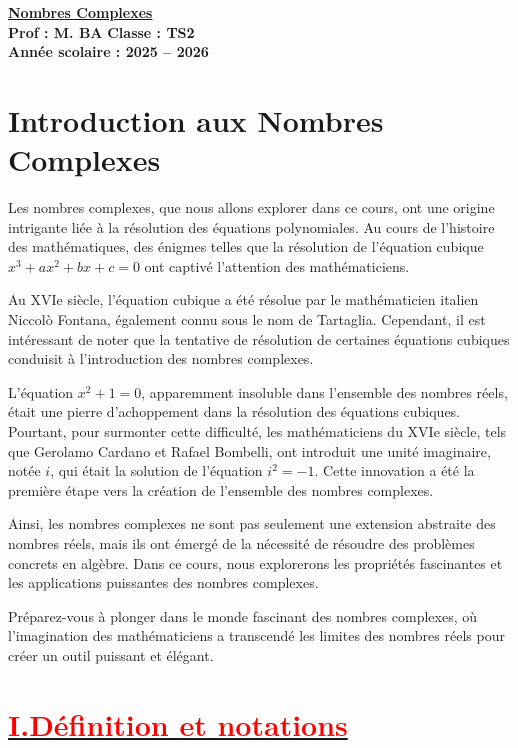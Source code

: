 \documentclass[12pt,a4paper]{article}
\begin{document}
\begin{center}
    \Large\textbf{\underline{Nombres Complexes}}\\[-0.1cm]
    \normalsize\textbf{Prof : M. BA} \hfill \textbf{Classe : TS2}\\[-0.1cm]
    \textbf{Année scolaire : 2025 -- 2026}
\end{center}

\section*{Introduction aux Nombres Complexes}

Les nombres complexes, que nous allons explorer dans ce cours, ont une origine intrigante liée à la résolution des équations polynomiales. Au cours de l'histoire des mathématiques, des énigmes telles que la résolution de l'équation cubique $x^3 + ax^2 + bx + c = 0$ ont captivé l'attention des mathématiciens.

Au XVIe siècle, l'équation cubique a été résolue par le mathématicien italien Niccolò Fontana, également connu sous le nom de Tartaglia. Cependant, il est intéressant de noter que la tentative de résolution de certaines équations cubiques conduisit à l'introduction des nombres complexes.

L'équation $x^2 + 1 = 0$, apparemment insoluble dans l'ensemble des nombres réels, était une pierre d'achoppement dans la résolution des équations cubiques. Pourtant, pour surmonter cette difficulté, les mathématiciens du XVIe siècle, tels que Gerolamo Cardano et Rafael Bombelli, ont introduit une unité imaginaire, notée $i$, qui était la solution de l'équation $i^2 = -1$. Cette innovation a été la première étape vers la création de l'ensemble des nombres complexes.

Ainsi, les nombres complexes ne sont pas seulement une extension abstraite des nombres réels, mais ils ont émergé de la nécessité de résoudre des problèmes concrets en algèbre. Dans ce cours, nous explorerons les propriétés fascinantes et les applications puissantes des nombres complexes.

Préparez-vous à plonger dans le monde fascinant des nombres complexes, où l'imagination des mathématiciens a transcendé les limites des nombres réels pour créer un outil puissant et élégant.

\section*{\underline{\textbf{\textcolor{red}{I.Définition et notations }}}}
\end{document}
